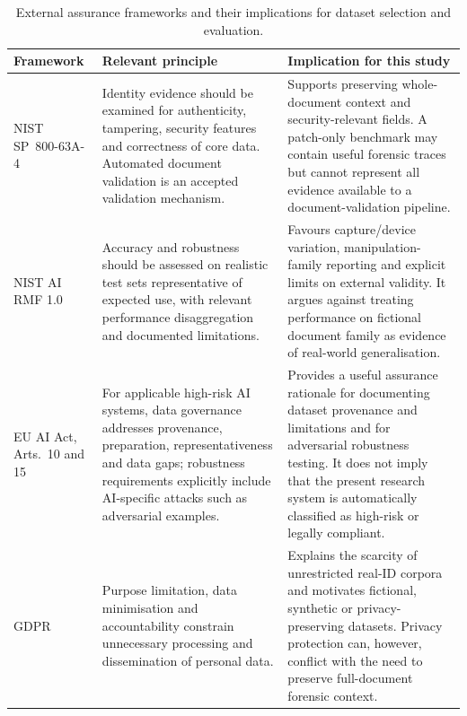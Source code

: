 \begin{table}[htbp]
\centering
\footnotesize
\renewcommand{\arraystretch}{1.17}
\caption{External assurance frameworks and their implications for dataset selection and evaluation.}
\label{tab:lr-assurance}
\begin{tabularx}{\textwidth}{@{}
>{\raggedright\arraybackslash}p{}
>{\raggedright\arraybackslash}p{}
>{\raggedright\arraybackslash}X@{}}
\toprule
Framework & Relevant principle & Implication for this study \\
\midrule

NIST SP~800-63A-4
\citep{nist2025sp80063a4}
&
Identity evidence should be examined for authenticity, tampering, security features and correctness of core data. Automated document validation is an accepted validation mechanism.
&
Supports preserving whole-document context and security-relevant fields. A patch-only benchmark may contain useful forensic traces but cannot represent all evidence available to a document-validation pipeline.
\\

NIST AI RMF 1.0
\citep{nist2023airmf}
&
Accuracy and robustness should be assessed on realistic test sets representative of expected use, with relevant performance disaggregation and documented limitations.
&
Favours capture/device variation, manipulation-family reporting and explicit limits on external validity. It argues against treating performance on fictional document family as evidence of real-world generalisation.
\\

EU AI Act, Arts.~10 and 15
\citep{eu2024aiact}
&
For applicable high-risk AI systems, data governance addresses provenance, preparation, representativeness and data gaps; robustness requirements explicitly include AI-specific attacks such as adversarial examples.
&
Provides a useful assurance rationale for documenting dataset provenance and limitations and for adversarial robustness testing. It does not imply that the present research system is automatically classified as high-risk or legally compliant.
\\

GDPR
\citep{eu2016gdpr}
&
Purpose limitation, data minimisation and accountability constrain unnecessary processing and dissemination of personal data.
&
Explains the scarcity of unrestricted real-ID corpora and motivates fictional, synthetic or privacy-preserving datasets. Privacy protection can, however, conflict with the need to preserve full-document forensic context.
\\


\end{tabularx}
\end{table}
